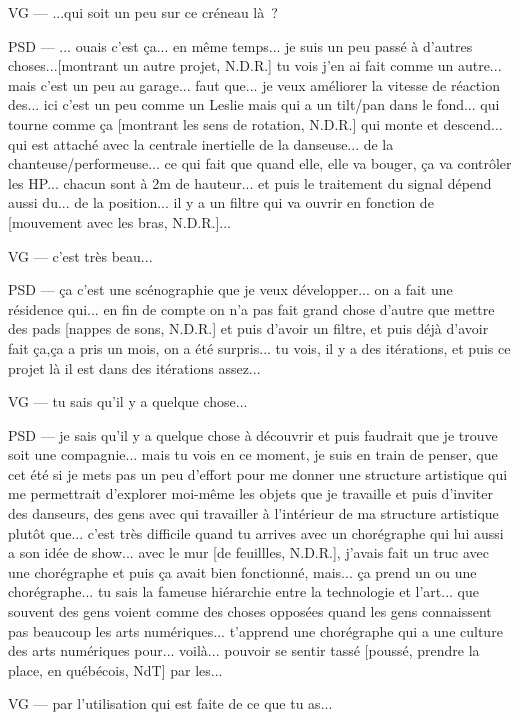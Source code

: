 VG — ...qui soit un peu sur ce créneau là ?

PSD — ... ouais c'est ça... en même temps... je suis un peu passé à d'autres choses...[montrant un autre projet, N.D.R.]  tu vois j'en ai fait comme un autre... mais c'est un peu au garage... faut que... je veux améliorer la vitesse de réaction des... ici c'est un peu comme un Leslie  mais qui a un tilt/pan dans le fond... qui tourne comme ça [montrant les sens de rotation, N.D.R.] qui monte et descend... qui est attaché avec la centrale inertielle de la danseuse... de la chanteuse/performeuse... ce qui fait que quand elle, elle va bouger, ça va contrôler les HP... chacun sont à 2m de hauteur... et puis le traitement du signal dépend aussi du... de la position... il y a un filtre qui va ouvrir en fonction de [mouvement avec les bras, N.D.R.]...

VG — c'est très beau...

PSD — ça c'est une scénographie que je veux développer... on a fait une résidence qui... en fin de compte on n'a pas fait grand chose d'autre que mettre des pads [nappes de sons, N.D.R.] et puis d'avoir un filtre, et puis déjà d'avoir fait ça,ça a pris un mois, on a été surpris... tu vois, il y a des itérations, et puis ce projet là il est dans des itérations assez...

VG — tu sais qu'il y a quelque chose...

PSD — je sais qu'il y a quelque chose à découvrir et puis faudrait que je trouve soit une compagnie... mais tu vois en ce moment, je suis en train de penser, que cet été si je mets pas un peu d'effort pour me donner une structure artistique qui me permettrait d'explorer moi-même les objets que je travaille et puis d'inviter des danseurs, des gens avec qui travailler à l'intérieur de ma structure artistique plutôt que... c'est très difficile quand tu arrives avec un chorégraphe qui lui aussi a son idée de show... avec le mur [de feuillles, N.D.R.], j'avais fait un truc avec une chorégraphe et puis ça avait bien fonctionné, mais... ça prend un ou une chorégraphe... tu sais la fameuse hiérarchie entre la technologie et l'art... que souvent des gens voient comme des choses opposées quand les gens connaissent pas beaucoup les arts numériques... t'apprend une chorégraphe qui a une culture des arts numériques pour... voilà... pouvoir se sentir tassé [poussé, prendre la place, en québécois, NdT]  par les...

VG — par l'utilisation qui est faite de ce que tu as...

